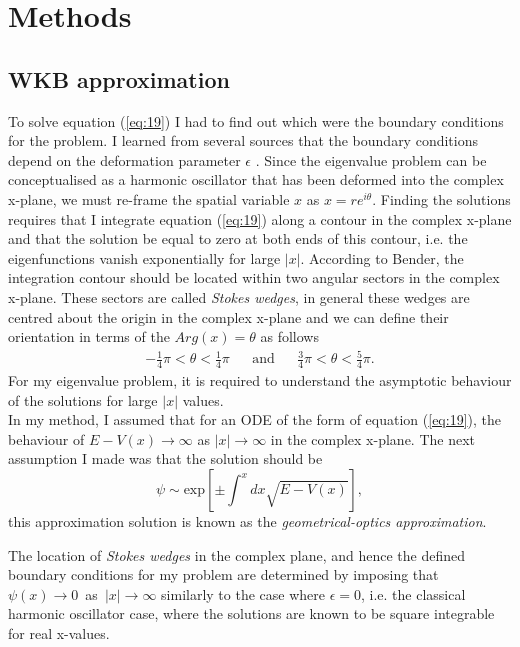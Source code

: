 \documentclass[10pt, a4paper, singlespacing]{report}
\begin{document}
\section{Methods}
\subsection{WKB approximation}\label{WKB}
To solve equation (\ref{eq:19}) I had to find out which were the boundary conditions for the problem. I learned from several sources that the boundary conditions depend on the deformation parameter $\epsilon$ \cite{BenderPT}\cite{Bender}\cite{Bender2017}. Since the eigenvalue problem can be conceptualised as a harmonic oscillator that has been deformed into the complex x-plane, we must re-frame the spatial variable $x$ as $x = r e^{i\theta}$. Finding the solutions requires that I integrate equation (\ref{eq:19}) along a contour in the complex x-plane and that the solution be equal to zero at both ends of this contour\cite{BenderPT}, i.e. the eigenfunctions vanish exponentially for large $|x|$. According to Bender, the integration contour should be located within two angular sectors in the complex x-plane. These sectors are called \emph{Stokes wedges}\cite{BenderPT}\cite{Bender}, in general these wedges are centred about the origin in the complex x-plane and we can define their orientation in terms of the $Arg(x) = \theta$ as follows
\begin{align} \label{eq:20}
&-\frac{1}{4} \pi < \theta < \frac{1}{4}\pi& &\mathrm{and}& &\frac{3}{4} \pi < \theta < \frac{5}{4}\pi.& 
\end{align}
For my eigenvalue problem, it is required to understand the asymptotic behaviour of the solutions for large $|x|$ values.\\
In my method, I assumed that for an ODE of the form of equation (\ref{eq:19}), the behaviour of $E - V(x) \rightarrow \infty$ as $|x| \rightarrow \infty$ in the complex x-plane. The next assumption I made was that the solution should be
\begin{equation} \label{eq:21}
\psi \sim \mathrm{exp}[\pm \int^{x}dx \sqrt{E - V(x)}],
\end{equation}
this approximation solution is known as the \emph{geometrical-optics approximation}\cite{BenderPT}.

The location of \emph{Stokes wedges} in the complex plane, and hence the defined boundary conditions for my problem are determined by imposing that \mbox{$\psi(x) \rightarrow 0$ as $|x| \rightarrow \infty$} similarly to the case where $\epsilon = 0$, i.e. the classical harmonic oscillator case, where the solutions are known to be square integrable for real x-values.
\end{document}
